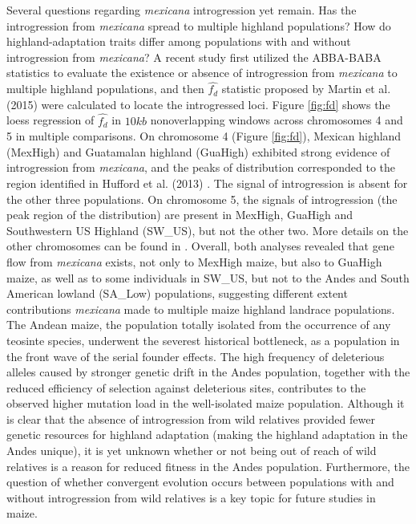\documentclass[11pt]{article}
\begin{document}
\begin{enumerate}
\begin{enumerate}
Several questions regarding \emph{mexicana} introgression yet remain.
Has the introgression from \emph{mexicana} spread to multiple highland populations? 
How do highland-adaptation traits differ among populations with and without introgression from \emph{mexicana}?
A recent study \cite{Wang2015manuscript} first utilized the ABBA-BABA statistics to evaluate the existence or absence of introgression from \emph{mexicana} to multiple highland populations, and then $\hat{f_{d}}$ statistic proposed by Martin et al. (2015) \citep{martin2015} were calculated to locate the introgressed loci. 
Figure \ref{fig:fd} shows the loess regression of $\hat{f_{d}}$ in $10kb$ non\-overlapping windows across chromosomes 4 and 5 in multiple comparisons. 
On chromosome 4 (Figure \ref{fig:fd}), Mexican highland (MexHigh) and Guatamalan highland (GuaHigh) exhibited strong evidence of introgression from \emph{mexicana}, and the peaks of distribution corresponded to the region identified in Hufford et al. (2013) \citep{hufford2013}.
The signal of introgression is absent for the other three populations.
On chromosome 5, the signals of introgression (the peak region of the distribution) are present in MexHigh, GuaHigh and Southwestern US Highland (SW\_US), but not the other two.
More details on the other chromosomes can be found in \cite{Wang2015manuscript}.
Overall, both analyses revealed that gene flow from \emph{mexicana} exists, not only to MexHigh maize, but also to GuaHigh maize, as well as to some individuals in SW\_US, but not to the Andes and South American lowland (SA\_Low) populations, suggesting different extent contributions \emph{mexicana} made to multiple maize highland landrace populations. 
The Andean maize, the population totally isolated from the occurrence of any teosinte species, underwent the severest historical bottleneck, as a population in the front wave of the serial founder effects. 
The high frequency of deleterious alleles caused by stronger genetic drift in the Andes population, together with the reduced efficiency of selection against deleterious sites, contributes to the observed higher mutation load in the well-isolated maize population.
Although it is clear that the absence of introgression from wild relatives provided fewer genetic resources for highland adaptation (making the highland adaptation in the Andes unique), it is yet unknown whether or not being out of reach of wild relatives is a reason for reduced fitness in the Andes population.
Furthermore, the question of whether convergent evolution occurs between populations with and without introgression from wild relatives is a key topic for future studies in maize.










\end{enumerate}
\end{enumerate}
\end{document}

